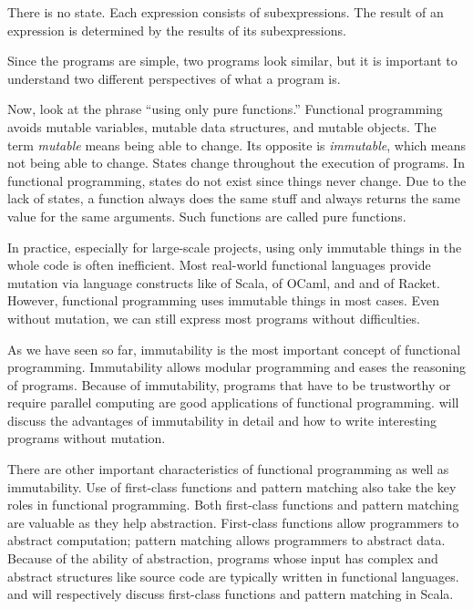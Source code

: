 There is no state. Each expression consists of subexpressions. The result of
an expression is determined by the results of its subexpressions.

Since the programs are simple, two programs look similar, but it is important to
understand two different perspectives of what a program is.

Now, look at the phrase ``using
only pure functions.'' Functional programming avoids mutable variables, mutable data
structures, and mutable objects. The term \textit{mutable}
means being able to change. Its opposite is \textit{immutable},
which means not being able to change. States change throughout the execution of programs.
In functional programming, states do not exist since things never change.
Due to the lack of states, a function always does the same stuff
and always returns the same value for the same arguments. Such functions
are called pure functions.

In practice, especially for large-scale projects, using only immutable things in
the whole code is often inefficient. Most real-world functional languages
provide mutation via language constructs like  of Scala,  of
OCaml, and  and  of Racket. However,
functional programming uses immutable things in most cases. Even without
mutation, we can still express most programs without difficulties.

As we have seen so far,
immutability is the most important concept of functional programming.
Immutability allows modular programming and eases the reasoning of programs.
Because of immutability, programs that have to be trustworthy or require parallel computing
are good applications of functional programming.
 will discuss the advantages of immutability in detail and
how to write interesting programs without mutation.

There are other important characteristics of functional programming as well as
immutability. Use of first-class functions and pattern matching also take the
key roles in functional programming. Both first-class functions and pattern matching
are valuable as they help abstraction. First-class functions allow programmers
to abstract computation; pattern matching allows programmers to abstract
data. Because of the ability of abstraction,
programs whose input has complex and abstract structures like source code
are typically written in functional languages.
 and  will respectively discuss first-class
functions and pattern matching in Scala.

